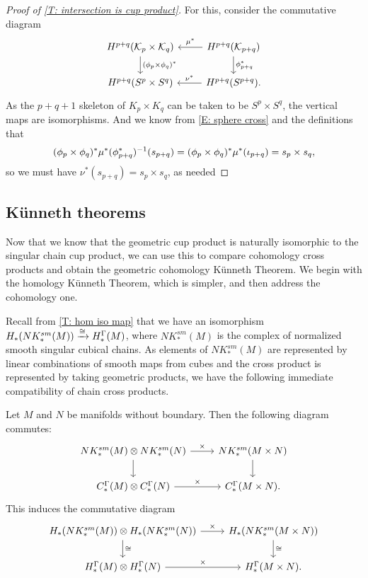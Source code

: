 \begin{proof}[Proof of \cref{T: intersection is cup product}]
	For this, consider the commutative diagram
	\[
	\begin{tikzcd}
		H^{p+q}(\mc K_p \times \mc K_q) \arrow[d, "(\phi_p \times \phi_q)^*"] &
		\arrow[l, "\mu^*"'] H^{p+q}(\mc K_{p+q}) \arrow[d, "\phi_{p+q}^*"] \\
		H^{p+q}(S^p \times S^q) & \arrow[l, "\nu^*"'] H^{p+q}(S^{p+q}).
	\end{tikzcd}
	\]
	As the $p+q+1$ skeleton of $K_p \times K_q$ can be taken to be $S^p \times S^q$, the vertical maps are isomorphisms.
	And we know from \eqref{E: sphere cross} and the definitions that
	$$(\phi_p \times \phi_q)^*\mu^*(\phi_{p+q}^*)^{-1}(s_{p+q}) = (\phi_p \times \phi_q)^*\mu^*(\iota_{p+q})\\
	= s_p \times s_q,$$
	so we must have $\nu^*(s_{p+q}) = s_p \times s_q$, as needed
\end{proof}

\subsection{K\"unneth theorems}

Now that we know that the geometric cup product is naturally isomorphic to the singular chain cup product, we can use this to compare cohomology cross products and obtain the geometric cohomology K\"unneth Theorem.
We begin with the homology K\"unneth Theorem, which is simpler, and then address the cohomology one.

Recall from \cref{T: hom iso map} that we have an isomorphism $H_*(NK^{sm}_*(M)) \xrightarrow{\cong} H_*^\Gamma(M)$, where $NK^{sm}_*(M)$ is the complex of normalized smooth singular cubical chains.
As elements of $NK^{sm}_*(M)$ are represented by linear combinations of smooth maps from cubes and the cross product is represented by taking geometric products, we have the following immediate compatibility of chain cross products.

\begin{lemma}\label{L: chain cross compare}
	Let $M$ and $N$ be manifolds without boundary.
	Then the following diagram commutes:
	\[
	\begin{tikzcd}
		NK^{sm}_*(M) \otimes NK^{sm}_*(N) \arrow{r}{\times} \arrow[d] & NK^{sm}_*(M \times N) \arrow[d] \\
		C_*^\Gamma(M) \otimes C_*^\Gamma(N) \arrow{r}{\times} & C_*^\Gamma(M \times N).
	\end{tikzcd}
	\]
	This induces the commutative diagram
	\[
	\begin{tikzcd}
		H_*(NK^{sm}_*(M)) \otimes H_*(NK^{sm}_*(N)) \arrow{r}{\times} \arrow[d, "\cong"] &
		H_*(NK^{sm}_*(M \times N)) \arrow[d, "\cong"] \\
		H_*^\Gamma(M) \otimes H_*^\Gamma(N) \arrow{r}{\times} & H_*^\Gamma(M \times N).
	\end{tikzcd}
	\]
\end{lemma}

